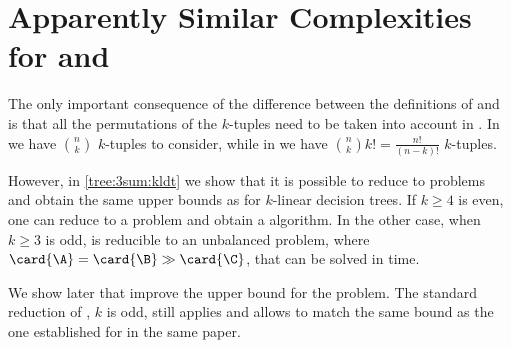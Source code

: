 \section{Apparently Similar Complexities for \kSUM and \kLDT}

The only important consequence of the difference between the definitions of
\kSUM and \kLDT is that all the permutations of the $k$-tuples need to be taken
into account in \kLDT. In \kSUM we have $\binom{n}{k}$ $k$-tuples to consider,
while in \kLDT we have $\binom{n}{k} k! = \frac{n!}{(n-k)!}$ $k$-tuples.

However, in \ref{tree:3sum:kldt} we show that it is possible to reduce \kLDT to
\kSUM problems and obtain the same upper bounds as \kSUM for $k$-linear
decision trees. If $k \ge 4$ is even, one can reduce \kLDT to a \twoSUM problem
and obtain a  algorithm. In the other case, when
$k \ge 3$ is odd, \kLDT is reducible to an unbalanced \threeSUM problem, where
$\card{\A} = \card{\B} \gg \card{\C}$, that can be solved in
 time.

We show later that \citet*{gronlund:2014} improve the upper bound for the
\threeSUM problem. The standard reduction of \kLDT, $k$ is odd, still applies
and allows to match the same 
bound as the one established for \threeSUM in the same paper.

